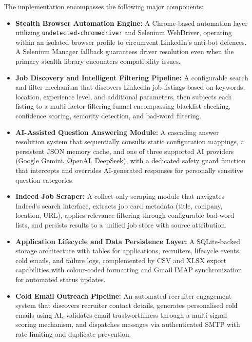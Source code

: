 \documentclass[12pt, a4paper, oneside]{report}
\begin{document}
The implementation encompasses the following major components:

\begin{itemize}
    \item \textbf{Stealth Browser Automation Engine:} A Chrome-based automation layer utilizing \texttt{undetected-chromedriver} and Selenium WebDriver, operating within an isolated browser profile to circumvent LinkedIn's anti-bot defences. A Selenium Manager fallback guarantees driver resolution even when the primary stealth library encounters compatibility issues.
    \item \textbf{Job Discovery and Intelligent Filtering Pipeline:} A configurable search and filter mechanism that discovers LinkedIn job listings based on keywords, location, experience level, and additional parameters, then subjects each listing to a multi-factor filtering funnel encompassing blacklist checking, confidence scoring, seniority detection, and bad-word filtering.
    \item \textbf{AI-Assisted Question Answering Module:} A cascading answer resolution system that sequentially consults static configuration mappings, a persistent JSON memory cache, and one of three supported AI providers (Google Gemini, OpenAI, DeepSeek), with a dedicated safety guard function that intercepts and overrides AI-generated responses for personally sensitive question categories.
    \item \textbf{Indeed Job Scraper:} A collect-only scraping module that navigates Indeed's search interface, extracts job card metadata (title, company, location, URL), applies relevance filtering through configurable bad-word lists, and persists results to a unified job store with source attribution.
    \item \textbf{Application Lifecycle and Data Persistence Layer:} A SQLite-backed storage architecture with tables for applications, recruiters, lifecycle events, cold emails, and failure logs, complemented by CSV and XLSX export capabilities with colour-coded formatting and Gmail IMAP synchronization for automated status updates.
    \item \textbf{Cold Email Outreach Pipeline:} An automated recruiter engagement system that discovers recruiter contact details, generates personalised cold emails using AI, validates email trustworthiness through a multi-signal scoring mechanism, and dispatches messages via authenticated SMTP with rate limiting and duplicate prevention.
\end{itemize}
\end{document}
